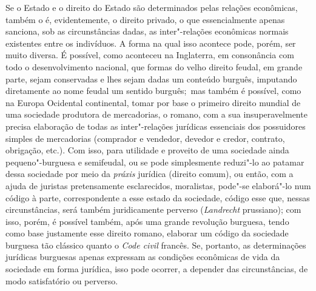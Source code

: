 Se o Estado e o direito do Estado são determinados pelas relações
econômicas, também o é, evidentemente, o direito privado, o que
essencialmente apenas sanciona, sob as circunstâncias dadas, as
inter"-relações econômicas normais existentes entre os indivíduos. A
forma na qual isso acontece pode, porém, ser muito diversa. É possível,
como aconteceu na Inglaterra, em consonância com todo o desenvolvimento
nacional, que formas do velho direito feudal, em grande parte, sejam
conservadas e lhes sejam dadas um conteúdo burguês, imputando
diretamente ao nome feudal um sentido burguês;\est\ mas também é possível,
como na Europa Ocidental continental, tomar por base o primeiro direito
mundial de uma sociedade produtora de mercadorias, o romano, com a sua
insuperavelmente precisa elaboração de todas as inter"-relações jurídicas
essenciais dos possuidores simples de mercadorias (comprador e vendedor,
devedor e credor, contrato, obrigação, etc.). Com isso, para utilidade e
proveito de uma sociedade ainda pequeno"-burguesa e semifeudal, ou se
pode simplesmente reduzi"-lo ao patamar dessa sociedade por meio da
\emph{práxis} jurídica (direito comum), ou então, com a ajuda de
juristas pretensamente esclarecidos, moralistas, pode"-se elaborá"-lo num
código à parte, correspondente a esse estado da sociedade, código esse
que, nessas circunstâncias, será também juridicamente perverso
(\emph{Landrecht} prussiano); com isso,
porém, é possível também, após uma grande revolução burguesa, tendo como %
base justamente esse direito romano, elaborar um código da sociedade
burguesa tão clássico quanto o \emph{Code
civil} francês. Se, portanto, as
determinações jurídicas burguesas apenas expressam as condições
econômicas de vida da sociedade em forma jurídica, isso pode ocorrer, a
depender das circunstâncias, de modo satisfatório ou
perverso.

